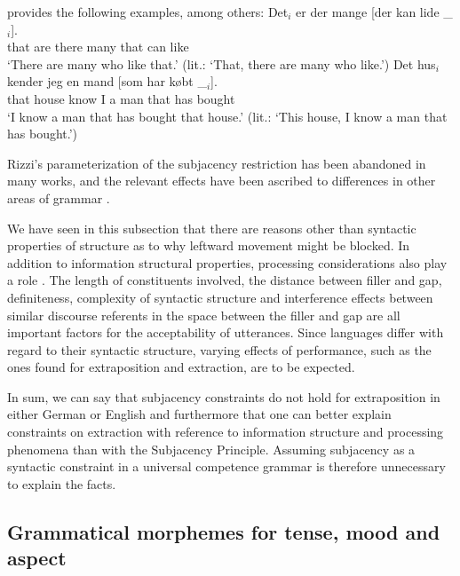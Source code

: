 \citet[]{Erteschik73a-u} provides the following examples, among others:
\eal
\label{Beispiel-Extraktion-Adjunkt}
\ex
\gll Det$_i$ er   der mange [der kan lide \_$_i$].\\
     that are there  many \hspaceThis{[}that can like\\
\glt `There are many who like that.' (lit.: `That, there are many who like.')
\ex
\gll Det    hus$_i$  kender jeg en    mand [som har købt \_$_i$].\\
     that   house  know  I a man \hspaceThis{[}that has bought\\
\glt `I know a man that has bought that house.' (lit.: `This house, I know a man that has bought.')
\zl

Rizzi's parameterization of the subjacency restriction has been abandoned in many works, and the relevant effects have been
ascribed to differences in other areas of grammar \citep{Adams84a,CMC83a,Grimshaw86b,Kluender92a}.


We have seen in this subsection that there are reasons other than syntactic properties of structure as to why leftward movement might be blocked.
In addition to information structural properties, processing considerations\label{Seite-Subjazenz-Performanz}
also play a role \citep*{Grosu73a,EC2000a,Gibson98a,KK93a,Hawkins99a,SHS2007a}.
The length of constituents involved, the distance between filler and gap, definiteness, complexity of syntactic structure and
interference effects between similar discourse referents in the space between the filler and gap are all important factors for
the acceptability of utterances. Since languages differ with regard to their syntactic structure,
varying effects of performance, such as the ones found for extraposition and extraction, are to be expected. 

In sum, we can say that subjacency constraints do not hold for extraposition in either German or English and furthermore that one can better
explain constraints on extraction with reference to information structure and processing phenomena than with the Subjacency Principle.
Assuming subjacency as a syntactic constraint in a universal competence grammar is therefore unnecessary to explain the facts.

\subsection{Grammatical morphemes for tense, mood and aspect}

